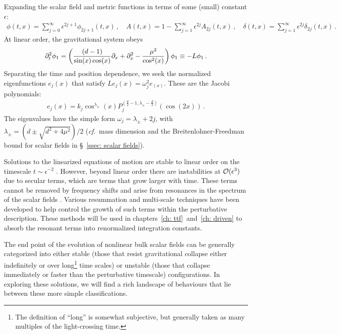 \documentclass[../PhD.tex]{subfiles}
\begin{document}
Expanding the scalar field and metric functions in terms of some (small) constant $\epsilon$:
\begin{align}
\phi(t,x) = \sum_{j=0}^{\infty} \epsilon^{2j + 1} \phi_{2j + 1} (t,x) \, , \quad A(t,x) = 1 - \sum_{j=1}^\infty \epsilon^{2j} A_{2j} (t,x) \, , \quad \delta(t,x) = \sum_{j=1}^\infty \epsilon^{2j} \delta_{2j} (t,x) \, .
\end{align}
At linear order, the gravitational system obeys
\begin{align}
\label{collapse eigen eqn}
\partial_t^2 \phi_1 = \left( \frac{ (d-1)}{\sin (x) \cos (x)} \partial_x + \partial^2_x - \frac{\mu^2}{\cos^2 (x)} \right) \phi_1 \equiv - L \phi_1 \, .
\end{align}
Separating the time and position dependence, we seek the normalized eigenfunctions $e_j(x)$ that satisfy $L e_j(x) = \omega_j^2 e_(x)$. These are the Jacobi polynomials:
\begin{align}
\label{scalar eigens}
e_j (x) = k_j \cos^{\lambda_\pm}(x) P_j^{(\frac{d}{2} - 1, \lambda_\pm - \frac{d}{2})} \left( \cos \left( 2x \right)\right) \, .
\end{align}
The eigenvalues have the simple form $\omega_j = \lambda_\pm + 2j$, with $\lambda_\pm = (d \pm \sqrt{d^2 + 4\mu^2})/2$ ({\it cf.}~mass dimension and the Breitenlohner-Freedman bound for scalar fields in \S~\!\ref{ssec: scalar fields}). 

Solutions to the linearized equations of motion are stable to linear order on the timescale $t \sim \epsilon^{-2}$ \cite{1506.07907}. However, beyond linear order there are instabilities at $\mathcal O(\epsilon^3)$ due to secular terms, which are terms that grow larger with time. These terms cannot be removed by frequency shifts and arise from resonances in the spectrum of the scalar fields \cite{1407.6273}. Various resummation \cite{hep-th/9506161} and multi-scale techniques \cite{1403.6471} have been developed to help control the growth of such terms within the perturbative description. These methods will be used in chapters~\ref{ch: ttf}~and~\ref{ch: driven} to absorb the resonant terms into renormalized integration constants.

The end point of the evolution of nonlinear bulk scalar fields can be generally categorized into either stable (those that resist gravitational collapse either indefinitely or over long\footnote{The definition of ``long'' is somewhat subjective, but generally taken as many multiples of the light-crossing time.} time scales) or unstable (those that collapse immediately or faster than the perturbative timescale) configurations. In exploring these solutions, we will find a rich landscape of behaviours that lie between these more simple classifications.
\end{document}

